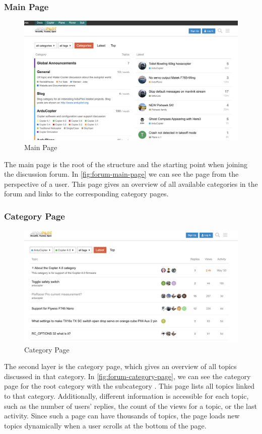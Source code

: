 \subsubsection{Main Page}
\begin{figure}
    \includegraphics[width=\textwidth]{figures/data_collection/forum_main_page}
    \caption{Main Page}\label{fig:forum-main-page}
\end{figure}
The main page is the root of the structure and the starting point when joining the discussion forum.
In \autoref{fig:forum-main-page} we can see the page from the perspective of a user.
This page gives an overview of all available categories in the forum and links to the corresponding category pages.

\subsubsection{Category Page}
\begin{figure}
    \includegraphics[width=\textwidth]{figures/data_collection/forum_category_page}
    \caption{Category Page}\label{fig:forum-category-page}
\end{figure}
The second layer is the category page, which gives an overview of all topics discussed in that category.
In \autoref{fig:forum-category-page}, we can see the category page for the root category  with the subcategory .
This page lists all topics linked to that category.
Additionally, different information is accessible for each topic, such as the number of users' replies, the count of the views for a topic, or the last activity.
Since such a page can have thousands of topics, the page loads new topics dynamically when a user scrolls at the bottom of the page.

